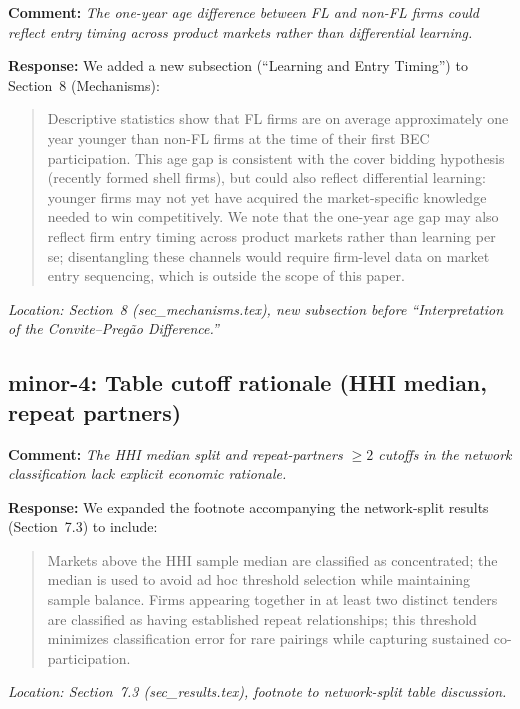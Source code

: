 \documentclass[12pt]{article}
\newcommand{\referee}[1]{\medskip\noindent\textbf{Comment:} \textit{#1}\medskip}
\newcommand{\response}[1]{\noindent\textbf{Response:} #1}
\begin{document}
\referee{The one-year age difference between FL and non-FL firms could
reflect entry timing across product markets rather than differential
learning.}

\response{We added a new subsection (``Learning and Entry Timing'') to
Section~8 (Mechanisms):}

\begin{quote}
Descriptive statistics show that FL firms are on average approximately
one year younger than non-FL firms at the time of their first BEC
participation. This age gap is consistent with the cover bidding
hypothesis (recently formed shell firms), but could also reflect
differential learning: younger firms may not yet have acquired the
market-specific knowledge needed to win competitively. We note that the
one-year age gap may also reflect firm entry timing across product
markets rather than learning per se; disentangling these channels would
require firm-level data on market entry sequencing, which is outside the
scope of this paper.
\end{quote}

\noindent\textit{Location: Section~8 (sec\_mechanisms.tex), new
subsection before ``Interpretation of the Convite--Preg\~ao
Difference.''}

\subsection*{minor-4: Table cutoff rationale (HHI median, repeat partners)}

\referee{The HHI median split and repeat-partners $\geq 2$ cutoffs in the
network classification lack explicit economic rationale.}

\response{We expanded the footnote accompanying the network-split results
(Section~7.3) to include:}

\begin{quote}
Markets above the HHI sample median are classified as concentrated; the
median is used to avoid ad hoc threshold selection while maintaining
sample balance. Firms appearing together in at least two distinct tenders
are classified as having established repeat relationships; this threshold
minimizes classification error for rare pairings while capturing
sustained co-participation.
\end{quote}

\noindent\textit{Location: Section~7.3 (sec\_results.tex), footnote to
network-split table discussion.}
\end{document}
